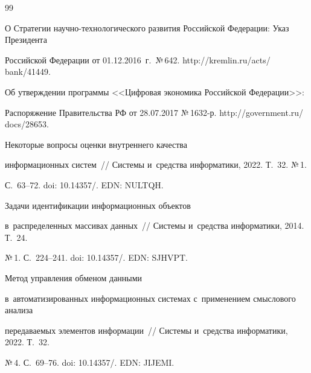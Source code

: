 {\small\frenchspacing


{%




\begin{thebibliography}{99}




О Стратегии научно-технологического развития Российской Федерации: Указ Президента 


Российской Федерации от 01.12.2016~г.\ №\,642. {\sf http://kremlin.ru/acts/ bank/41449}.




Об утверждении программы <<Цифровая экономика Российской Федерации>>: 


Распоряжение Правительства РФ от 28.07.2017 №\,1632-р. {\sf http://government.ru/ docs/28653}.




 Некоторые вопросы оценки внутреннего качества 


информационных систем~/\!\!/ Сис\-те\-мы и~средства информатики, 2022. Т.~32. №\,1.  


С.~63--72. doi: 10.14357\!/. EDN: NULTQH.







 Задачи идентификации информационных объектов 


в~распределенных массивах данных~/\!\!/ Системы и~средства информатики, 2014. Т.~24. 


№\,1. С.~224--241. doi: 10.14357\!/. EDN: SJHVPT.







 Метод управления обменом данными 


в~автоматизированных информационных сис\-те\-мах с~применением смыслового анализа 


передаваемых элементов информации~/\!\!/ Системы и~средства информатики, 2022. Т.~32. 


№\,4. С.~69--76. doi: 10.14357\!/. EDN: JIJEMI.








\end{thebibliography}}}
